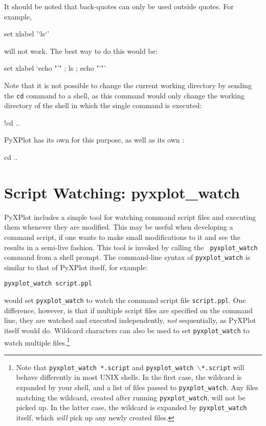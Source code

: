 It should be noted that back-quotes can only be used outside quotes. For
example,

\begin{dontdo}
set xlabel '`ls`'
\end{dontdo}

\noindent will not work. The best way to do this would be:

\begin{dodo}
set xlabel `echo "'" ; ls ; echo "'"`
\end{dodo}

Note that it is not possible to change the current working directory by sending
the {\tt cd} command to a shell, as this command would only change the working
directory of the shell in which the single command is executed:

\begin{dontdo}
!cd ..
\end{dontdo}

\noindent PyXPlot has its own  for this purpose, as well as its own
:

\begin{dodo}
cd ..
\end{dodo}

\section{Script Watching: pyxplot\_watch}

PyXPlot includes a simple tool for watching command script files and executing
them whenever they are modified. This may be useful when developing a command
script, if one wants to make small modifications to it and see the results in a
semi-live fashion. This tool is invoked by calling the {\tt
pyxplot\_watch} command from a
shell prompt. The command-line syntax of {\tt pyxplot\_watch} is similar to
that of PyXPlot itself, for example:

\begin{verbatim}
pyxplot_watch script.ppl
\end{verbatim}

\noindent would set {\tt pyxplot\_watch} to watch the command script file
{\tt script.ppl}. One difference, however, is that if multiple script files are
specified on the command line, they are watched and executed independently,
\textit{not} sequentially, as PyXPlot itself would do. Wildcard characters can
also be used to set {\tt pyxplot\_watch} to watch multiple
files.\footnote{Note that {\tt pyxplot\_watch *.script} and
{\tt pyxplot\_watch $\backslash$*.script} will behave differently in most
UNIX shells.  In the first case, the wildcard is expanded by your shell, and a
list of files passed to {\tt pyxplot\_watch}. Any files matching the
wildcard, created after running {\tt pyxplot\_watch}, will not be picked up.
In the latter case, the wildcard is expanded by {\tt pyxplot\_watch} itself,
which {\it will} pick up any newly created files.}

